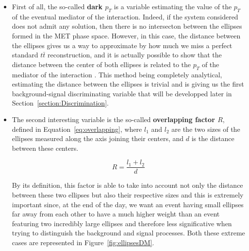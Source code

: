 \documentclass[a4paper, 10pt, openright]{report}
\begin{document}
\begin{itemize}
\item First of all, the so-called \textbf{dark $p_T$} is a variable estimating the value of the $p_T$ of the eventual mediator of the interaction. Indeed, if the system considered does not admit any solution, then there is no intersecton between the ellipses formed in the \ac{MET} phase space. However, in this case, the distance between the ellipses gives us a way to approximate by how much we miss a perfect standard $t \bar t$ reconstruction, and it is actually possible to show that the distance between the center of both ellipses is related to the $p_T$ of the mediator of the interaction \cite{Agustin}. This method being completely analytical, estimating the distance between the ellipses is trivial and is giving us the first background-signal discriminating variable that will be developped later in Section~\ref{section:Discrimination}.
\item The second interesting variable is the so-called \textbf{overlapping factor $R$}, defined in Equation~\ref{eq:overlapping}, where $l_1$ and $l_2$ are the two sizes of the ellipses measured along the axis joining their centers, and $d$ is the distance between these centers.

\begin{equation}
\label{eq:overlapping}
R = \frac{l_1 + l_2}{d}
\end{equation}

By its definition, this factor is able to take into account not only the distance between these two ellipses but also their respective sizes and this is extremely important since, at the end of the day, we want an event having small ellipses far away from each other to have a much higher weight than an event featuring two incredibly large ellipses and therefore less significative when trying to distinguish the background and signal processes. Both these extreme cases are represented in Figure~\ref{fig:ellipsesDM}.


\end{itemize}
\end{document}
